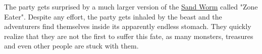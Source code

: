 \begin{description}[leftmargin=*]
	\item[\color{accent} Zone Eater:]
	The party gets surprised by a much larger version of the \hyperlink{abyssworm}{Sand Worm} called "Zone Eater".
	Despite any effort, the party gets inhaled by the beast and the adventurers find themselves inside its apparently endless stomach.
	They quickly realize that they are not the first to suffer this fate, as many monsters, treasures and even other people are stuck with them.
\end{description}
\pagebreak

